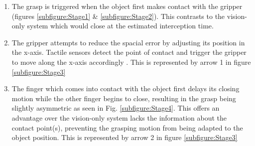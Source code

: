 \begin{enumerate}
    \item The grasp is triggered when the object first makes contact with the gripper (figures \ref{subfigure:Stage1} \& \ref{subfigure:Stage2}). This contrasts to the vision-only system which would close at the estimated interception time.
    \item The gripper attempts to reduce the spacial error by adjusting its position in the x-axis. Tactile sensors detect the point of contact and trigger the gripper to move along the x-axis accordingly . This is represented by arrow 1 in figure \ref{subfigure:Stage3}
    \item The finger which comes into contact with the object first delays its closing motion while the other finger begins to close, resulting in the grasp being slightly asymmetric as seen in Fig. \ref{subfigure:Stage4}. This offers an advantage over the vision-only system lacks the information about the contact point(s), preventing the grasping motion from being adapted to the object position. This is represented by arrow 2 in figure \ref{subfigure:Stage3}
\end{enumerate}

